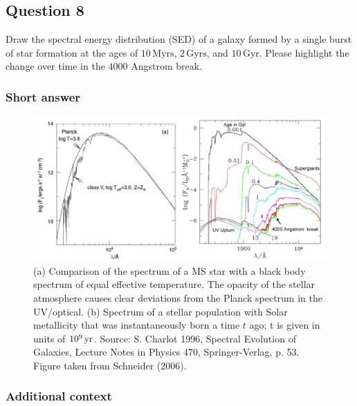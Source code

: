 \documentclass[a4paper,11pt]{article}
\begin{document}

\newpage
\subsection{Question 8}

Draw the spectral energy distribution (SED) of a galaxy formed by a single burst of star formation at the ages of $10\,\mathrm{Myrs}$, $2\,\mathrm{Gyrs}$, and $10\,\mathrm{Gyr}$. Please highlight the change over time in the $4000$ Angstrom break.

\subsubsection{Short answer}

\begin{figure}[h]
    \includegraphics[width=16cm]{figures/SED_SF.png}
    \centering
    \caption{\footnotesize{(a) Comparison of the spectrum of a MS star with a black body spectrum of equal effective temperature. The opacity of the stellar atmosphere causes clear deviations from the Planck spectrum in the UV/optical. (b) Spectrum of a stellar population with Solar metallicity that was instantaneously born a time $t$ ago; t is given in units of $10^9\,{\rm yr}$. Source: S. Charlot 1996, Spectral Evolution of Galaxies, Lecture Notes in Physics 470, Springer-Verlag, p. 53. Figure taken from Schneider (2006).}}
    \label{fig:sedsf}
\end{figure}

\subsubsection{Additional context}
\end{document}
